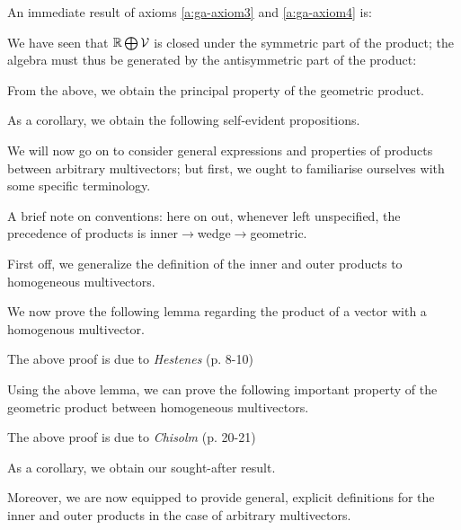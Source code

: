 An immediate result of axioms \ref{a:ga-axiom3} and \ref{a:ga-axiom4} is:





We have seen that $\mathbb{R} \bigoplus \mathcal{V}$ is closed under the symmetric part of the product; the algebra must thus be generated by the antisymmetric part of the product:


From the above, we obtain the principal property of the geometric product.



As a corollary, we obtain the following self-evident propositions.



We will now go on to consider general expressions and properties of products between arbitrary multivectors; but first, we ought to familiarise ourselves with some specific terminology.

A brief note on conventions: here on out, whenever left unspecified, the precedence of products is inner$\to$wedge$\to$geometric.

First off, we generalize the definition of the inner and outer products to homogeneous multivectors.



We now prove the following lemma regarding the product of a vector with a homogenous multivector.



The above proof is due to \textit{Hestenes} (p. 8-10)\cite{ga-origin}

Using the above lemma, we can prove the following important property of the geometric product between homogeneous multivectors.



The above proof is due to \textit{Chisolm} (p. 20-21)\cite{ga-chisolm}

As a corollary, we obtain our sought-after result.



Moreover, we are now equipped to provide general, explicit definitions for the inner and outer products in the case of arbitrary multivectors.



\newpage

